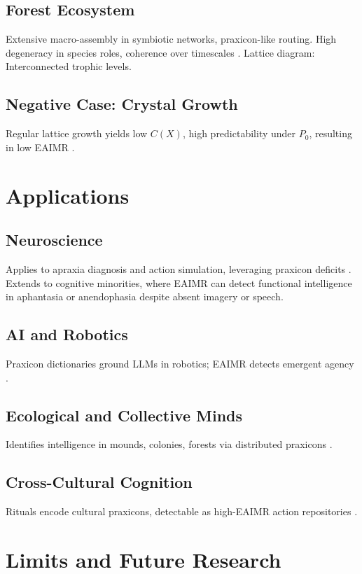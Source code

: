 \documentclass{article}
\begin{document}
\subsection{Forest Ecosystem}
Extensive macro-assembly in symbiotic networks, praxicon-like routing. High degeneracy in species roles, coherence over timescales \citep{levin2019}. Lattice diagram: Interconnected trophic levels.

\subsection{Negative Case: Crystal Growth}
Regular lattice growth yields low \(C(X)\), high predictability under \(P_0\), resulting in low EAIMR \citep{hazen2007}.

\section{Applications}
\label{sec:applications}

\subsection{Neuroscience}
Applies to apraxia diagnosis and action simulation, leveraging praxicon deficits \citep{peigneux2004, vannuscorps2023}. Extends to cognitive minorities, where EAIMR can detect functional intelligence in aphantasia or anendophasia despite absent imagery or speech.

\subsection{AI and Robotics}
Praxicon dictionaries ground LLMs in robotics; EAIMR detects emergent agency \citep{pastra2011, anderson2007}.

\subsection{Ecological and Collective Minds}
Identifies intelligence in mounds, colonies, forests via distributed praxicons \citep{camazine2001, simondon2017}.

\subsection{Cross-Cultural Cognition}
Rituals encode cultural praxicons, detectable as high-EAIMR action repositories \citep{ortega1961}.

\section{Limits and Future Research}
\label{sec:limits}
\end{document}
